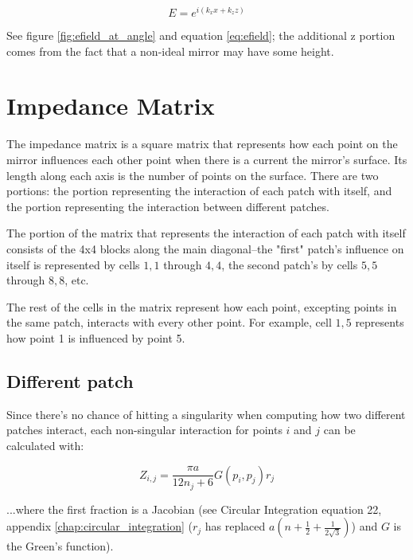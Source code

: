 \documentclass[etd,senior,noacknowledgments]{BYUPhys}
\begin{document}
\begin{equation}
  E=e^{i\left(k_{x}x+k_{z}z\right)}
\end{equation}

See figure \ref{fig:efield_at_angle} and equation \ref{eq:efield}; the additional z portion comes from the fact that a non-ideal mirror may have some height.



\section{Impedance Matrix} \label{sec:impedance}

The impedance matrix is a square matrix that represents how each point on the mirror influences each other point when there is a current the mirror's surface. Its length along each axis is the number of points on the surface. There are two portions: the portion representing the interaction of each patch with itself, and the portion representing the interaction between different patches.

The portion of the matrix that represents the interaction of each patch with itself consists of the 4x4 blocks along the main diagonal--the "first" patch's influence on itself is represented by cells $1,1$ through $4,4$, the second patch's by cells $5,5$ through $8,8$, etc.

The rest of the cells in the matrix represent how each point, excepting points in the same patch, interacts with every other point. For example, cell $1,5$ represents how point 1 is influenced by point 5.

\subsection{Different patch} \label{sec:different_patch}

Since there's no chance of hitting a singularity when computing how two different patches interact, each non-singular interaction for points $i$ and $j$ can be calculated with:

\begin{equation}
  Z_{i,j}=\frac{\pi a}{12n_{j}+6}G\left(p_{i},p_{j}\right)r_{j}
\end{equation}

...where the first fraction is a Jacobian (see Circular Integration equation 22, appendix \ref{chap:circular_integration} ($r_{j}$ has replaced $a\left(n+\frac{1}{2}+\frac{1}{2\sqrt{3}}\right)$) and $G$ is the Green's function).
\end{document}
